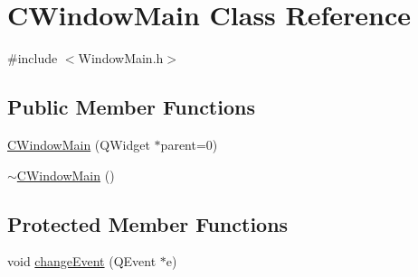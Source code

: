 \hypertarget{classCWindowMain}{
\section{CWindowMain Class Reference}
\label{classCWindowMain}
}


{\ttfamily \#include $<$WindowMain.h$>$}\subsection*{Public Member Functions}
\begin{DoxyCompactItemize}
\item 
\hyperlink{classCWindowMain_ab2ee214f54da9d9e3493e32c17dceb3b}{CWindowMain} (QWidget $\ast$parent=0)
\item 
\hyperlink{classCWindowMain_ae916ee64d7cf20837fa6cf92a94084bb}{$\sim$CWindowMain} ()
\end{DoxyCompactItemize}
\subsection*{Protected Member Functions}
\begin{DoxyCompactItemize}
\item 
void \hyperlink{classCWindowMain_a3093f6da18ce5571d3461f03c725a37e}{changeEvent} (QEvent $\ast$e)
\end{DoxyCompactItemize}
